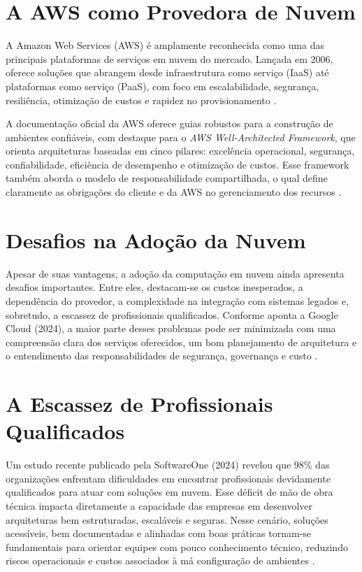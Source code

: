 \section{A AWS como Provedora de Nuvem}
A Amazon Web Services (AWS) é amplamente reconhecida como uma das principais plataformas de serviços em nuvem do mercado. Lançada em 2006, oferece soluções que abrangem desde infraestrutura como serviço (IaaS) até plataformas como serviço (PaaS), com foco em escalabilidade, segurança, resiliência, otimização de custos e rapidez no provisionamento \cite{awsdocs2024}.

A documentação oficial da AWS oferece guias robustos para a construção de ambientes confiáveis, com destaque para o \textit{AWS Well-Architected Framework}, que orienta arquiteturas baseadas em cinco pilares: excelência operacional, segurança, confiabilidade, eficiência de desempenho e otimização de custos. Esse framework também aborda o modelo de responsabilidade compartilhada, o qual define claramente as obrigações do cliente e da AWS no gerenciamento dos recursos \cite{awswell2023}.

\section{Desafios na Adoção da Nuvem}
Apesar de suas vantagens, a adoção da computação em nuvem ainda apresenta desafios importantes. Entre eles, destacam-se os custos inesperados, a dependência do provedor, a complexidade na integração com sistemas legados e, sobretudo, a escassez de profissionais qualificados. Conforme aponta a Google Cloud (2024), a maior parte desses problemas pode ser minimizada com uma compreensão clara dos serviços oferecidos, um bom planejamento de arquitetura e o entendimento das responsabilidades de segurança, governança e custo \cite{googlecloud2024}.

\section{A Escassez de Profissionais Qualificados}
Um estudo recente publicado pela SoftwareOne (2024) revelou que 98\% das organizações enfrentam dificuldades em encontrar profissionais devidamente qualificados para atuar com soluções em nuvem. Esse déficit de mão de obra técnica impacta diretamente a capacidade das empresas em desenvolver arquiteturas bem estruturadas, escaláveis e seguras. Nesse cenário, soluções acessíveis, bem documentadas e alinhadas com boas práticas tornam-se fundamentais para orientar equipes com pouco conhecimento técnico, reduzindo riscos operacionais e custos associados à má configuração de ambientes \cite{softwareone2024}.


